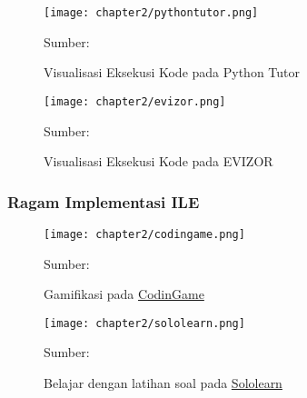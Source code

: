 \begin{figure}[!h]
  \centering
  \texttt{[image: chapter2/pythontutor.png]}
  \caption{Visualisasi Eksekusi Kode pada Python Tutor} \label{fig:pythontutor}
  Sumber: \textcite{guo2013pythontutor}
\end{figure}

\begin{figure}[!h]
  \centering
  \texttt{[image: chapter2/evizor.png]}
  \caption{Visualisasi Eksekusi Kode pada EVIZOR} \label{fig:evizor}
  Sumber: \textcite{moons2013pilot}
\end{figure}

\subsubsection{Ragam Implementasi ILE} \label{sssec:ragam-implementasi-ile}

\begin{figure}[!h]
  \centering
  \texttt{[image: chapter2/codingame.png]}
  \caption{\label{fig:codingame}Gamifikasi pada \href{https://www.codingame.com}{CodinGame}}
  Sumber: \textcite{codingame2021media}
\end{figure}


\begin{figure}[!h]
  \centering
  \texttt{[image: chapter2/sololearn.png]}
  \caption{\label{fig:sololearn}Belajar dengan latihan soal pada \href{https://www.sololearn.com}{Sololearn}}
  Sumber: \textcite{sololearn2021media}
\end{figure}

